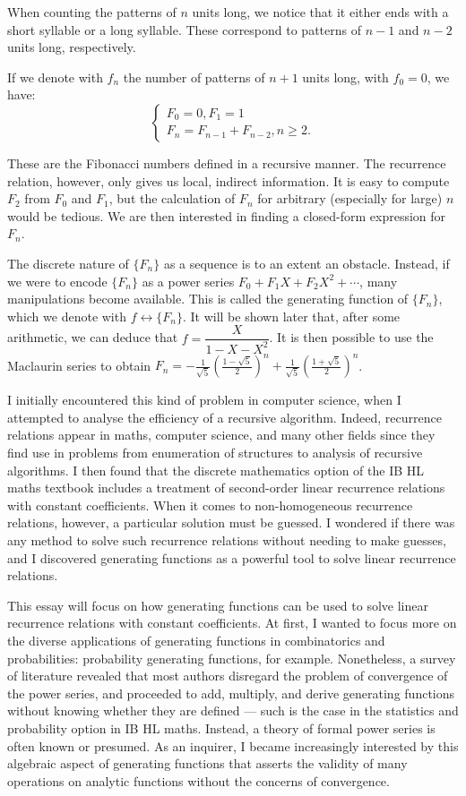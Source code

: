 \documentclass[a4paper, 12pt]{report}
\begin{document}
When counting the patterns of $n$ units long, we notice that it either ends with a short syllable or a long syllable. These correspond to patterns of $n - 1$ and $n - 2$ units long, respectively.

If we denote with $f_n$ the number of patterns of $n + 1$ units long, with $f_0 = 0$, we have:
\[\begin{cases}
F_0 = 0, F_1 = 1\\
F_n = F_{n - 1} + F_{n - 2}, n \geq 2.
\end{cases}\]

These are the Fibonacci numbers defined in a recursive manner. The recurrence relation, however, only gives us local, indirect information. It is easy to compute $F_2$ from $F_0$ and $F_1$, but the calculation of $F_n$ for arbitrary (especially for large) $n$ would be tedious. We are then interested in finding a closed-form expression for $F_n$. 

The discrete nature of $\{F_n\}$ as a sequence is to an extent an obstacle. Instead, if we were to encode $\{F_n\}$ as a power series $F_0 + F_1 X + F_2 X^2 + \cdots$, many manipulations become available. This is called the generating function of $\{F_n\}$, which we denote with $f \longleftrightarrow \{F_n\}$. It will be shown later that, after some arithmetic, we can deduce that $f = \dfrac{X}{1 - X - X^2}$. It is then possible to use the Maclaurin series to obtain $F_n = -\frac{1}{\sqrt{5}} \left(\frac{1 - \sqrt{5}}{2}\right)^n + \frac{1}{\sqrt{5}} \left(\frac{1 + \sqrt{5}}{2}\right)^n$.

I initially encountered this kind of problem in computer science, when I attempted to analyse the efficiency of a recursive algorithm. Indeed, recurrence relations appear in maths, computer science, and many other fields since they find use in problems from enumeration of structures to analysis of recursive algorithms. I then found that the discrete mathematics option of the IB HL maths textbook includes a treatment of second-order linear recurrence relations with constant coefficients. When it comes to non-homogeneous recurrence relations, however, a particular solution must be guessed. I wondered if there was any method to solve such recurrence relations without needing to make guesses, and I discovered generating functions as a powerful tool to solve linear recurrence relations.

This essay will focus on how generating functions can be used to solve linear recurrence relations with constant coefficients. At first, I wanted to focus more on the diverse applications of generating functions in combinatorics and probabilities: probability generating functions, for example. Nonetheless, a survey of literature revealed that most authors disregard the problem of convergence of the power series, and proceeded to add, multiply, and derive generating functions without knowing whether they are defined --- such is the case in the statistics and probability option in IB HL maths. Instead, a theory of formal power series is often known or presumed. As an inquirer, I became increasingly interested by this algebraic aspect of generating functions that asserts the validity of many operations on analytic functions without the concerns of convergence.
\end{document}
